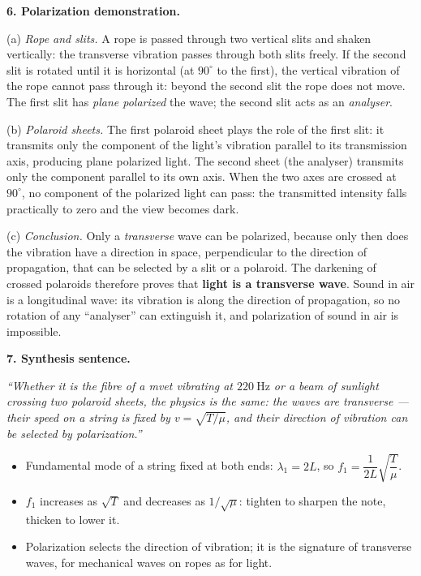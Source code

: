 \documentclass[11pt]{article}
\begin{document}
\textbf{6. Polarization demonstration.}\par
(a) \emph{Rope and slits.} A rope is passed through two vertical slits and shaken vertically: the transverse vibration passes through both slits freely. If the second slit is rotated until it is horizontal (at $90^{\circ}$ to the first), the vertical vibration of the rope cannot pass through it: beyond the second slit the rope does not move. The first slit has \emph{plane polarized} the wave; the second slit acts as an \emph{analyser}.\par
(b) \emph{Polaroid sheets.} The first polaroid sheet plays the role of the first slit: it transmits only the component of the light's vibration parallel to its transmission axis, producing plane polarized light. The second sheet (the analyser) transmits only the component parallel to its own axis. When the two axes are crossed at $90^{\circ}$, no component of the polarized light can pass: the transmitted intensity falls practically to zero and the view becomes dark.\par
(c) \emph{Conclusion.} Only a \emph{transverse} wave can be polarized, because only then does the vibration have a direction in space, perpendicular to the direction of propagation, that can be selected by a slit or a polaroid. The darkening of crossed polaroids therefore proves that \textbf{light is a transverse wave}. Sound in air is a longitudinal wave: its vibration is along the direction of propagation, so no rotation of any ``analyser'' can extinguish it, and polarization of sound in air is impossible.

\textbf{7. Synthesis sentence.}\par
\emph{``Whether it is the fibre of a mvet vibrating at $220\ \mathrm{Hz}$ or a beam of sunlight crossing two polaroid sheets, the physics is the same: the waves are transverse — their speed on a string is fixed by $v=\sqrt{T/\mu}$, and their direction of vibration can be selected by polarization.''}

\begin{aretenir}
\begin{itemize}
\item Fundamental mode of a string fixed at both ends: $\lambda_1=2L$, so $f_1=\dfrac{1}{2L}\sqrt{\dfrac{T}{\mu}}$.
\item $f_1$ increases as $\sqrt{T}$ and decreases as $1/\sqrt{\mu}$: tighten to sharpen the note, thicken to lower it.
\item Polarization selects the direction of vibration; it is the signature of transverse waves, for mechanical waves on ropes as for light.
\end{itemize}
\end{aretenir}
\end{document}
